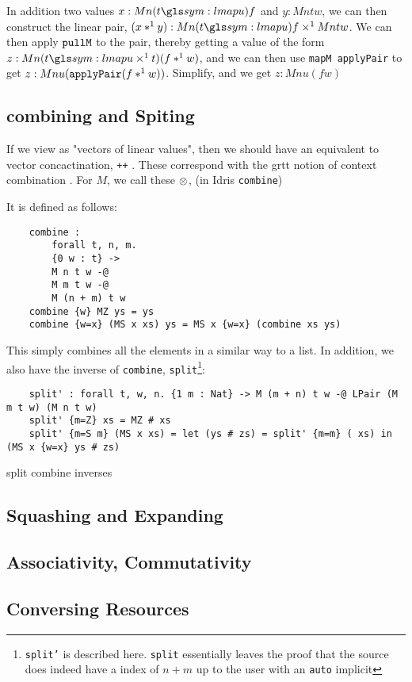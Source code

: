 In addition two values $x : M n (t \proc u) f$ and $y : M n t w$, we can then construct the linear pair, $(x *^1 y) : M n (t \proc u) f \lpair M n t w$. We can then apply $\verb|pullM|$ to the pair, thereby getting a value of the form $z : M n (t \proc u \lpair t) (f *^1 w)$, and we can then use \verb|mapM applyPair| to get $z : M n u (\verb|applyPair| (f *^1 w))$.
Simplify, and we get $z : M n u (f w)$
\subsection{combining and Spiting}

\label{sec:combine_split}

If we view \tmu as "vectors of linear values", then we should have an equivalent to vector concactination, \verb|++| \cite{idris_linear}.
These correspond with the \gls{grtt} notion of context combination \cite{quant_graded_modal}.
For $M$, we call these $\otimes$, (in Idris \verb|combine|)

It is defined as follows:

\begin{verbatim}
	combine : 
		forall t, n, m. 
		{0 w : t} -> 
		M n t w -@ 
		M m t w -@ 
		M (n + m) t w
	combine {w} MZ ys = ys
	combine {w=x} (MS x xs) ys = MS x {w=x} (combine xs ys)
\end{verbatim}

This simply combines all the elements in a similar way to a list.
In addition, we also have the inverse of \verb|combine|, \verb|split|\footnote{\texttt{split'} is described here. \texttt{split} essentially leaves the proof that the source does indeed have a index of $n+m$ up to the user with an \texttt{auto} implicit}:

\begin{verbatim}
	split' : forall t, w, n. {1 m : Nat} -> M (m + n) t w -@ LPair (M m t w) (M n t w)
	split' {m=Z} xs = MZ # xs
	split' {m=S m} (MS x xs) = let (ys # zs) = split' {m=m} ( xs) in (MS x {w=x} ys # zs)
\end{verbatim}

\begin{lemma}
	 split combine inverses
\end{lemma}

\subsection{Squashing and Expanding}

\label{sec:squash_expand}


\subsection{Associativity, Commutativity}

\label{sec:assoc_comm}


\subsection{Conversing Resources}


